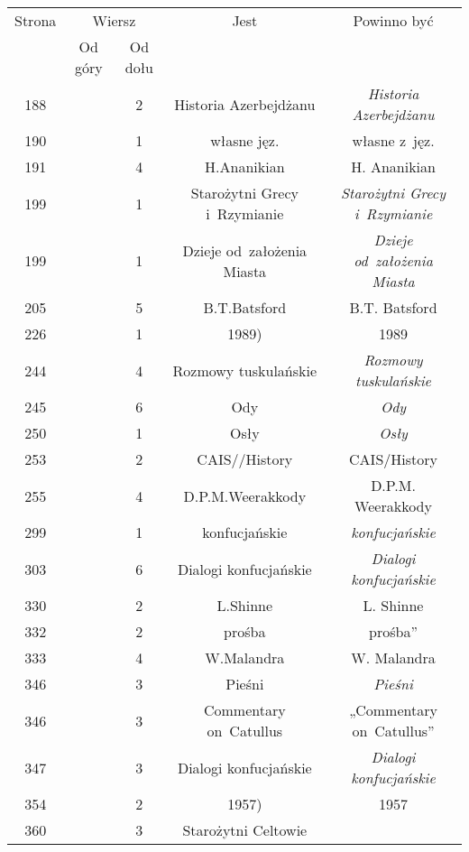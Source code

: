\documentclass[a4paper,11pt]{article}
\begin{document}
\begin{center}
  \begin{tabular}{|c|c|c|c|c|}
    \hline
    Strona & \multicolumn{2}{c|}{Wiersz} & Jest
    & Powinno być \\ \cline{2-3}
    & Od góry & Od dołu & & \\
    \hline
    188 & & \hphantom{0}2 & Historia Azerbejdżanu
    & \textit{Historia Azerbejdżanu} \\
    190 & & \hphantom{0}1 & własne jęz. & własne z~jęz. \\
    191 & & \hphantom{0}4 & H.Ananikian & H. Ananikian \\
    199 & & \hphantom{0}1 & Starożytni Grecy i~Rzymianie
    & \textit{Starożytni Grecy i~Rzymianie} \\
    199 & & \hphantom{0}1 & Dzieje od~założenia Miasta
           & \textit{Dzieje od~założenia Miasta} \\
    205 & & \hphantom{0}5 & B.T.Batsford & B.T. Batsford \\
    226 & & \hphantom{0}1 & 1989) & 1989 \\
    244 & & \hphantom{0}4 & Rozmowy tuskulańskie
    & \textit{Rozmowy tuskulańskie} \\
    245 & & \hphantom{0}6 & Ody & \textit{Ody} \\
    250 & & \hphantom{0}1 & Osły & \textit{Osły} \\
    253 & & \hphantom{0}2 & CAIS//History & CAIS/History \\
    255 & & \hphantom{0}4 & D.P.M.Weerakkody & D.P.M. Weerakkody \\
    299 & & \hphantom{0}1 & konfucjańskie & \textit{konfucjańskie} \\
    303 & & \hphantom{0}6 & Dialogi konfucjańskie
    & \textit{Dialogi konfucjańskie} \\
    330 & & \hphantom{0}2 & L.Shinne & L. Shinne \\
    332 & & \hphantom{0}2 & prośba & prośba'' \\
    333 & & \hphantom{0}4 & W.Malandra & W. Malandra \\
    346 & & \hphantom{0}3 & Pieśni & \textit{Pieśni} \\
    346 & & \hphantom{0}3 & Commentary on~Catullus
    & „Commentary on~Catullus” \\
    347 & & \hphantom{0}3 & Dialogi konfucjańskie
    & \textit{Dialogi konfucjańskie} \\
    354 & & \hphantom{0}2 & 1957) & 1957 \\
    360 & & \hphantom{0}3 & Starożytni Celtowie

\end{tabular}
\end{center}
\end{document}
